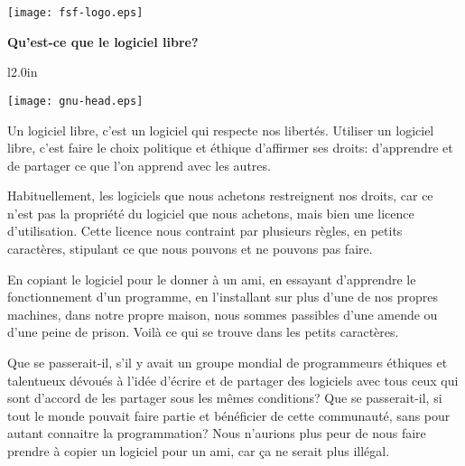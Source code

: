 \documentclass[12pt]{article}
\begin{document}
\begin{center}

\texttt{[image: fsf-logo.eps]}

\vspace{0.3in}

{\Huge\bf Qu'est-ce que le logiciel libre?}

\end{center}

\begin{wrapfigure}[15]{l}{2.0in}
 \begin{center}
   \texttt{[image: gnu-head.eps]}
 \end{center}
\end{wrapfigure}

Un logiciel libre, c'est un logiciel qui respecte nos libertés. Utiliser un
logiciel libre, c'est faire le choix politique et éthique d'affirmer ses
droits: d'apprendre et de partager ce que l'on apprend avec les autres.


Habituellement, les logiciels que nous achetons restreignent nos droits, car ce
n'est pas la propriété du logiciel que nous achetons, mais bien une licence
d'utilisation. Cette licence nous contraint par plusieurs règles, en petits
caractères, stipulant ce que nous pouvons et ne pouvons pas faire.


En copiant le logiciel pour le donner à un ami, en essayant d'apprendre le
fonctionnement d'un programme, en l'installant sur plus d'une de nos propres
machines, dans notre propre maison, nous sommes passibles d'une amende ou d'une
peine de prison. Voilà ce qui se trouve dans les petits caractères.


Que se passerait-il, s'il y avait un groupe mondial de programmeurs éthiques et
talentueux dévoués à l'idée d'écrire et de partager des logiciels avec tous
ceux qui sont d'accord de les partager sous les mêmes conditions? Que se
passerait-il, si tout le monde pouvait faire partie et bénéficier de cette
communauté, sans pour autant connaitre la programmation? Nous n'aurions plus
peur de nous faire prendre à copier un logiciel pour un ami, car ça ne serait
plus illégal.
\end{document}
